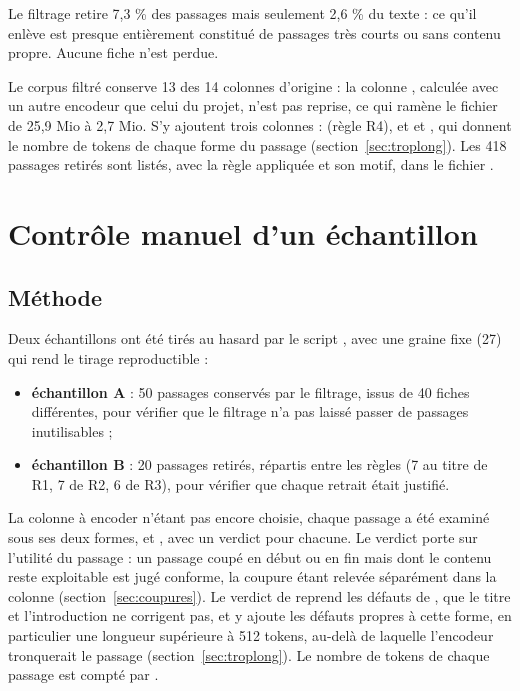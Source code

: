 Le filtrage retire 7,3 \% des passages mais seulement 2,6 \% du texte : ce qu'il enlève est presque
entièrement constitué de passages très courts ou sans contenu propre. Aucune fiche n'est perdue.

Le corpus filtré conserve 13 des 14 colonnes d'origine : la colonne , calculée
avec un autre encodeur que celui du projet, n'est pas reprise, ce qui ramène le fichier de 25,9 Mio à
2,7 Mio. S'y ajoutent trois colonnes :
 (règle R4), et  et , qui donnent le nombre
de tokens de chaque forme du passage (section~\ref{sec:troplong}).
Les 418 passages retirés sont listés, avec la règle appliquée et son motif, dans le fichier
.

\section{Contrôle manuel d'un échantillon}\label{sec:controle}

\subsection{Méthode}

Deux échantillons ont été tirés au hasard par le script , avec
une graine fixe (27) qui rend le tirage reproductible :

\begin{itemize}
\item \textbf{échantillon A} : 50 passages conservés par le filtrage, issus de 40 fiches différentes,
pour vérifier que le filtrage n'a pas laissé passer de passages inutilisables ;
\item \textbf{échantillon B} : 20 passages retirés, répartis entre les règles (7 au titre de R1, 7 de R2,
6 de R3), pour vérifier que chaque retrait était justifié.
\end{itemize}

La colonne à encoder n'étant pas encore choisie, chaque passage a été examiné sous ses deux formes,
 et , avec un verdict pour chacune. Le verdict porte sur l'utilité du
passage : un passage coupé en début ou en fin mais dont le contenu reste exploitable est jugé conforme,
la coupure étant relevée séparément dans la colonne  (section~\ref{sec:coupures}). Le
verdict de  reprend les défauts de , que le titre et l'introduction ne
corrigent pas, et y ajoute les défauts propres à cette forme, en particulier une longueur supérieure à
512 tokens, au-delà de laquelle l'encodeur tronquerait le passage (section~\ref{sec:troplong}). Le
nombre de tokens de chaque passage est compté par .

